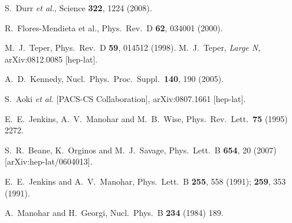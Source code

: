 \documentclass[twocolumn,nofootinbib,prd,aps,superscriptaddress,tightenlines]{revtex4}
\begin{document}
\begin{thebibliography}{99}
  S.~Durr {\it et al.},
  Science {\bf 322}, 1224 (2008).

  R.~Flores-Mendieta et al.,
  Phys.\ Rev.\  D {\bf 62}, 034001 (2000).

  M.~J.~Teper,
  Phys.\ Rev.\  D {\bf 59}, 014512 (1998).
  M.~J.~Teper, {\sl Large N,}
  arXiv:0812.0085 [hep-lat].

  A.~D.~Kennedy,
  Nucl.\ Phys.\ Proc.\ Suppl.\  {\bf 140}, 190 (2005).

  S.~Aoki {\it et al.}  [PACS-CS Collaboration],
  arXiv:0807.1661 [hep-lat].

  E.~E.~Jenkins, A.~V.~Manohar and M.~B.~Wise,
  Phys.\ Rev.\ Lett.\  {\bf 75} (1995) 2272.
  
  S.~R.~Beane, K.~Orginos and M.~J.~Savage,
  Phys.\ Lett.\  B {\bf 654}, 20 (2007)
  [arXiv:hep-lat/0604013].

  E.~E.~Jenkins and A.~V.~Manohar,
  Phys.\ Lett.\  B {\bf 255}, 558 (1991);
  {\bf 259}, 353 (1991).

  A.~Manohar and H.~Georgi,
  Nucl.\ Phys.\  B {\bf 234} (1984) 189.
  

\end{thebibliography}
\end{document}
